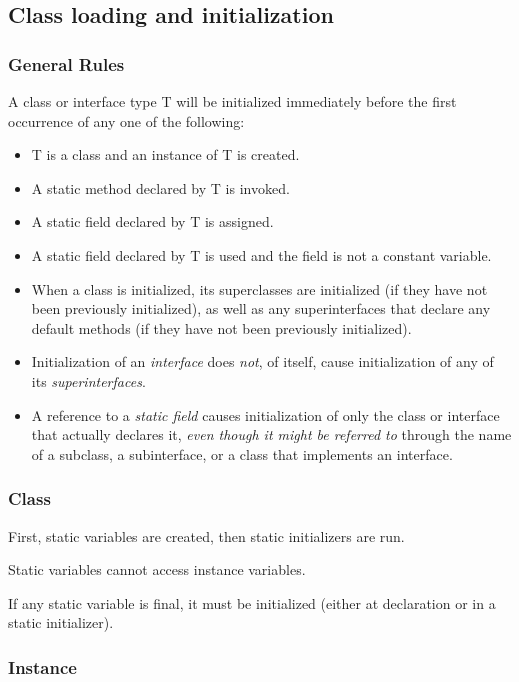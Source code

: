 \documentclass{scrartcl}
\begin{document}
\subsection{Class loading and initialization}

\subsubsection{General Rules}

A class or interface type T will be initialized immediately before the first occurrence of any one of the following:

\begin{itemize}
    \item T is a class and an instance of T is created.
    \item A static method declared by T is invoked.
    \item A static field declared by T is assigned.
    \item A static field declared by T is used and the field is not a constant variable.
    \item When a class is initialized, its superclasses are initialized (if they have not been previously initialized), as well as any superinterfaces that declare any default methods (if they have not been previously initialized).
    \item Initialization of an \textit{interface} does \textit{not}, of itself, cause initialization of any of its \textit{superinterfaces}.
    \item A reference to a \textit{static field} causes initialization of only the class or interface that actually declares it, \textit{even though it might be referred to} through the name of a subclass, a subinterface, or a class that implements an interface.
\end{itemize}

\subsubsection{Class}

    First, static variables are created, then static initializers are run.

    Static variables cannot access instance variables.

    If any static variable is final, it must be initialized (either at declaration or in a static initializer).

\subsubsection{Instance}
\end{document}
